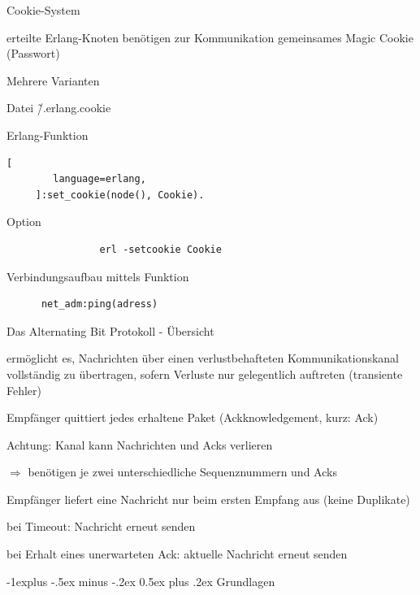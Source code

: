 \documentclass[10pt]{article}
\makeatletter
\renewcommand{\subsection}{\@startsection{subsection}{2}{0mm}%
                                {-1explus -.5ex minus -.2ex}%
                                {0.5ex plus .2ex}%
                                {\normalfont\normalsize\bfseries}}
\makeatother
\begin{document}
  Cookie-System
  \begin{itemize*}
    \item erteilte Erlang-Knoten benötigen zur Kommunikation gemeinsames Magic Cookie (Passwort)
    \item Mehrere Varianten
    \begin{itemize*}
      \item Datei \~/.erlang.cookie
      \item Erlang-Funktion
      \begin{lstlisting}[
        language=erlang,
     ]:set_cookie(node(), Cookie).
    \end{lstlisting}
      \item Option
      \begin{lstlisting}
                erl -setcookie Cookie
              \end{lstlisting}
    \end{itemize*}
    \item Verbindungsaufbau mittels Funktion
    \begin{lstlisting}
      net_adm:ping(adress)
    \end{lstlisting}
  \end{itemize*}
  
  Das Alternating Bit Protokoll - Übersicht
  \begin{itemize*}
    \item ermöglicht es, Nachrichten über einen verlustbehafteten Kommunikationskanal vollständig zu übertragen, sofern Verluste nur gelegentlich auftreten (transiente Fehler)
    \item Empfänger quittiert jedes erhaltene Paket (Ackknowledgement, kurz: Ack)
    \item Achtung: Kanal kann Nachrichten und Acks verlieren
    \begin{itemize*}
      \item $\Rightarrow$ benötigen je zwei unterschiedliche Sequenznummern und Acks
    \end{itemize*}
    \item Empfänger liefert eine Nachricht nur beim ersten Empfang aus (keine Duplikate)
    \item bei Timeout: Nachricht erneut senden
    \item bei Erhalt eines unerwarteten Ack: aktuelle Nachricht erneut senden
  \end{itemize*}
  
  \subsection{Grundlagen}
\end{document}
